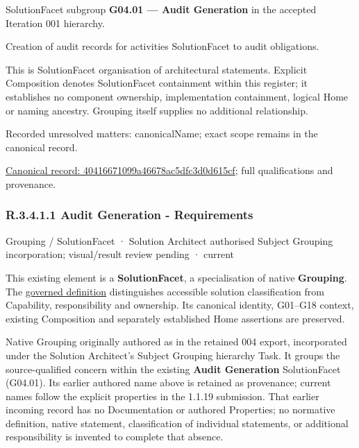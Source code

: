 SolutionFacet subgroup \textbf{G04.01 — Audit Generation} in the accepted Iteration 001 hierarchy.



Creation of audit records for activities SolutionFacet to audit obligations.



This is SolutionFacet organisation of architectural statements. Explicit Composition denotes SolutionFacet containment within this register; it establishes no component ownership, implementation containment, logical Home or naming ancestry. Grouping itself supplies no additional relationship.


{\small Recorded unresolved matters: canonicalName; exact scope remains in the canonical record.}\par
{\footnotesize \href{../../../../../../../continuum/grouping/40416671099a46678ac5dfc3d0d615cf.md}{Canonical record: 40416671099a46678ac5dfc3d0d615cf}; full qualifications and provenance.}\par
\subsubsection*{R.3.4.1.1 Audit Generation - Requirements}
\label{navigation:R.3.4.1.1}

\label{element:9fec9301e759460880557df71baa19c0}
{\small Grouping / SolutionFacet · Solution Architect authorised Subject Grouping incorporation; visual/result review pending · current}\par

This existing element is a \textbf{SolutionFacet}, a specialisation of native
\textbf{Grouping}. The \href{\detokenize{../../../../../../../governance/continuum-representation.md#solutionfacet-classification--1119-candidate}}{governed definition}
distinguishes accessible solution classification from Capability, responsibility
and ownership. Its canonical identity, G01–G18 context, existing Composition
and separately established Home assertions are preserved.



Native Grouping originally authored as \texttt{} in the retained 004 export,
incorporated under the Solution Architect's Subject Grouping hierarchy Task.
It groups the source-qualified \texttt{} concern within
the existing \textbf{Audit Generation} SolutionFacet (G04.01). Its earlier authored name above is retained as provenance; current names
follow the explicit properties in the 1.1.19 submission.
That earlier incoming record has no Documentation or authored Properties; no normative
definition, native statement, classification of individual statements, or
additional responsibility is invented to complete that absence.



